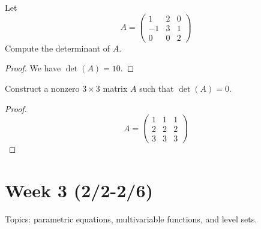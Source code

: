 \documentclass[openany]{book}
\begin{document}
\begin{prob}
    Let 
    \begin{equation*}
        A=\begin{pmatrix}
            1&2&0\\
            -1&3&1\\
            0&0&2
        \end{pmatrix}
    \end{equation*}
    Compute the determinant of $A$.
\end{prob}
\begin{proof}
    We have $\det(A)=10$.
\end{proof}

\begin{prob}
    Construct a nonzero $3\times 3$ matrix $A$ such that $\det(A)=0$.
\end{prob}
\begin{proof}
    \begin{equation*}
        A=\begin{pmatrix}
            1&1&1\\
            2&2&2\\
            3&3&3
        \end{pmatrix}
    \end{equation*}
\end{proof}


\newpage 
\section*{\centering Week 3 (2/2-2/6)}
Topics: parametric equations, multivariable functions, and level sets.
\end{document}
